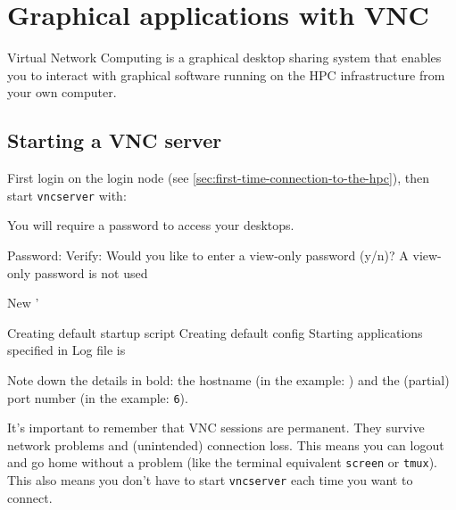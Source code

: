 \chapter{Graphical applications with VNC}
\label{ch:vnc}

Virtual Network Computing is a graphical desktop sharing system that enables you
to interact with graphical software running on the HPC infrastructure from your own
computer.


\section{Starting a VNC server}
\label{sec:start-vnc}

First login on the login node (see \autoref{sec:first-time-connection-to-the-hpc}),
then start \lstinline|vncserver| with:

\begin{prompt}
You will require a password to access your desktops.

Password:%
Verify:%
Would you like to enter a view-only password (y/n)? %
A view-only password is not used

New '%

Creating default startup script %
Creating default config %
Starting applications specified in %
Log file is %

\end{prompt}


Note down the details in bold: the hostname (in the example: \texttt{\loginhost{}})
and the (partial) port number (in the example: \lstinline|6|).

It's important to remember that VNC sessions are permanent. They survive network
problems and (unintended) connection loss. This means you can logout and go home
without a problem (like the terminal equivalent \lstinline|screen| or \lstinline|tmux|).
This also means you don't have to start \lstinline|vncserver| each time you want to connect.

